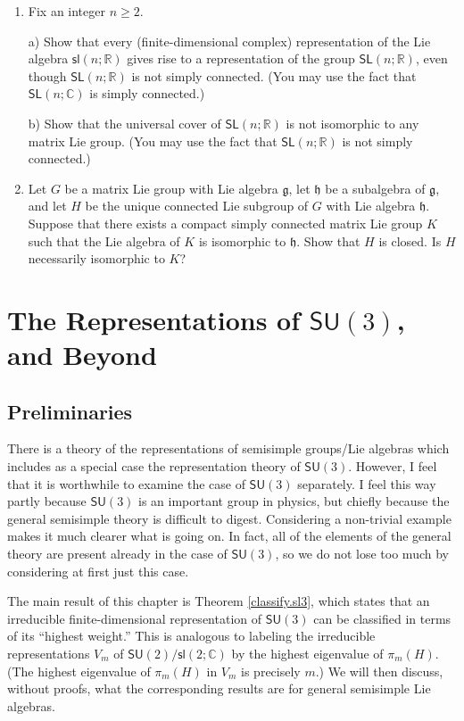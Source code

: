 \documentclass[12pt]{amsbook}
\let \frak = \mathfrak
\theoremstyle{plain}
\numberwithin{equation}{chapter}
\numberwithin{theorem}{chapter}
\begin{document}
\begin{enumerate}
\item \label{not.matrix}Fix an integer $n\geq2$.

a) Show that every (finite-dimensional complex) representation of the Lie
algebra $\mathsf{sl}\left(  n;\mathbb{R}\right)  $ gives rise to a
representation of the group $\mathsf{SL}\left(  n;\mathbb{R}\right)  $, even
though $\mathsf{SL}\left(  n;\mathbb{R}\right)  $ is not simply connected.
(You may use the fact that $\mathsf{SL}\left(  n;\mathbb{C}\right)  $ is
simply connected.)

b) Show that the universal cover of $\mathsf{SL}\left(  n;\mathbb{R}\right)  $
is not isomorphic to any matrix Lie group. (You may use the fact that
$\mathsf{SL}\left(  n;\mathbb{R}\right)  $ is not simply connected.)

\item  Let $G$ be a matrix Lie group with Lie algebra $\frak{g}$, let
$\frak{h}$ be a subalgebra of $\frak{g}$, and let $H$ be the unique connected
Lie subgroup of $G$ with Lie algebra $\frak{h}$. Suppose that there exists a
compact simply connected matrix Lie group $K$ such that the Lie algebra of $K$
is isomorphic to $\frak{h}$. Show that $H$ is closed. Is $H$ necessarily
isomorphic to $K$?
\end{enumerate}

\chapter{The Representations of $\mathsf{SU}(3)$, and Beyond}

\section{Preliminaries}

There is a theory of the representations of semisimple groups/Lie algebras
which includes as a special case the representation theory of $\mathsf{SU}(3)
$. However, I feel that it is worthwhile to examine the case of $\mathsf{SU}%
(3)$ separately. I feel this way partly because $\mathsf{SU}(3)$ is an
important group in physics, but chiefly because the general semisimple theory
is difficult to digest. Considering a non-trivial example makes it much
clearer what is going on. In fact, all of the elements of the general theory
are present already in the case of $\mathsf{SU}(3)$, so we do not lose too
much by considering at first just this case.

The main result of this chapter is Theorem \ref{classify.sl3}, which states
that an irreducible finite-dimensional representation of $\mathsf{SU}(3)$ can
be classified in terms of its ``highest weight.'' This is analogous to
labeling the irreducible representations $V_{m}$ of $\mathsf{SU}%
(2)/\mathsf{sl}(2;\mathbb{C})$ by the highest eigenvalue of $\pi_{m}(H)$. (The
highest eigenvalue of $\pi_{m}(H)$ in $V_{m}$ is precisely $m$.) We will then
discuss, without proofs, what the corresponding results are for general
semisimple Lie algebras.
\end{document}
